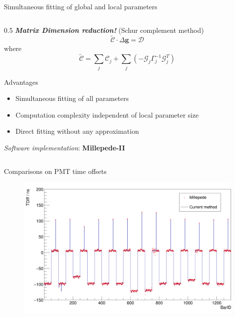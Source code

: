 \documentclass[compress, 13pt, aspectratio=169]{beamer}
\begin{document}
\begin{frame}[t,fragile]{Simultaneous fitting of global and local parameters}
\begin{columns}[t]
\begin{column}[t]{0.45\textwidth}
			\begin{spacing} {0.5}
				\small
				\textbf{\textit{Matrix Dimension reduction!}} (Schur complement method)
				$$\tilde{\mathcal{C}} \cdot \Delta \mathbf{g} = \mathcal{D}$$
				where
				$$\tilde{\mathcal{C}} = \sum_j \mathcal{C}_j + \sum_j \left(-\mathcal{G}_j \Gamma^{-1}_j \mathcal{G}^T_j \right)$$
			\end{spacing}
			\begin{exampleblock} {Advantages}
				\small
				\begin{itemize}
					\item Simultaneous fitting of all parameters
					\item Computation complexity independent of local parameter size
					\item Direct fitting without any approximation
				\end{itemize}
			\end{exampleblock}
			\textit{Software implementation}: \large{\textbf{Millepede-II}}\footnotemark
		\end{column}
	\end{columns}

\end{frame}

\begin{frame}[t]{Comparisons on PMT time offsets}
	\begin{figure}[t]
		\vspace*{-1em}
		\centering
		\includegraphics[height = 0.9 \textheight]{t_diff.png}
	\end{figure}
\end{frame}
\end{document}

